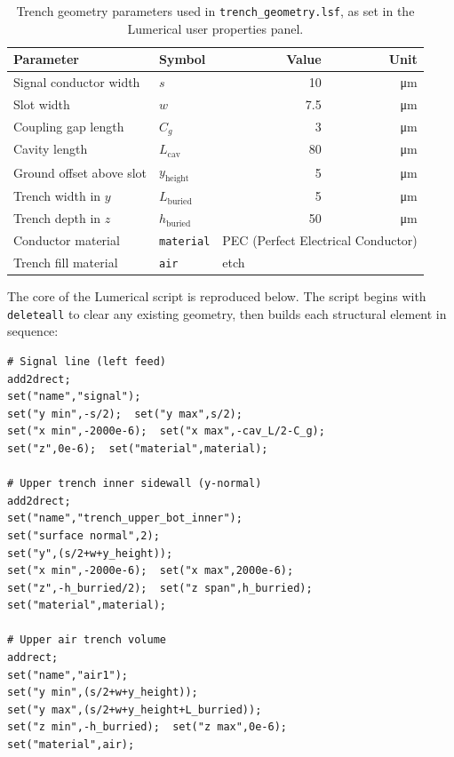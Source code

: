 \documentclass[12pt,a4paper]{article}
\begin{document}
\begin{table}[htbp]
    \centering
    \caption{Trench geometry parameters used in \texttt{trench\_geometry.lsf}, as set in the Lumerical user properties panel.}
    \label{tab:trench_params}
    \begin{tabular}{llrr}
        \toprule
        Parameter & Symbol & Value & Unit \\
        \midrule
        Signal conductor width    & $s$                      & 10  & \si{\micro\metre} \\
        Slot width                & $w$                      & 7.5 & \si{\micro\metre} \\
        Coupling gap length       & $C_g$                    & 3   & \si{\micro\metre} \\
        Cavity length             & $L_{\mathrm{cav}}$       & 80  & \si{\micro\metre} \\
        Ground offset above slot  & $y_{\mathrm{height}}$    & 5   & \si{\micro\metre} \\
        Trench width in $y$       & $L_{\mathrm{buried}}$    & 5   & \si{\micro\metre} \\
        Trench depth in $z$       & $h_{\mathrm{buried}}$    & 50  & \si{\micro\metre} \\
        Conductor material        & \texttt{material}        & \multicolumn{2}{l}{PEC (Perfect Electrical Conductor)} \\
        Trench fill material      & \texttt{air}             & \multicolumn{2}{l}{etch} \\
        \bottomrule
    \end{tabular}
\end{table}

The core of the Lumerical script is reproduced below. The script
begins with \texttt{deleteall} to clear any existing geometry, then
builds each structural element in sequence:

\begin{lstlisting}[language=Lumerical, style=lumerical,
    caption={Key excerpt from \texttt{trench\_geometry.lsf}: signal
    line, ground planes, and trench sidewall construction.},
    label={lst:trench}]
# Signal line (left feed)
add2drect;
set("name","signal");
set("y min",-s/2);  set("y max",s/2);
set("x min",-2000e-6);  set("x max",-cav_L/2-C_g);
set("z",0e-6);  set("material",material);

# Upper trench inner sidewall (y-normal)
add2drect;
set("name","trench_upper_bot_inner");
set("surface normal",2);
set("y",(s/2+w+y_height));
set("x min",-2000e-6);  set("x max",2000e-6);
set("z",-h_burried/2);  set("z span",h_burried);
set("material",material);

# Upper air trench volume
addrect;
set("name","air1");
set("y min",(s/2+w+y_height));
set("y max",(s/2+w+y_height+L_burried));
set("z min",-h_burried);  set("z max",0e-6);
set("material",air);
\end{lstlisting}
\end{document}
